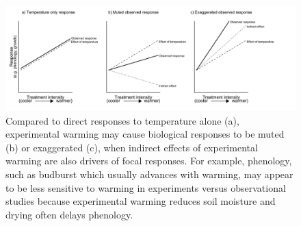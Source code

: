 \documentclass{article}
\begin{document}
 \clearpage
 \begin{figure}[h]
 \includegraphics{../Analyses/figures/DirIndWarmingEffects.pdf} 
 \caption{Compared to direct responses to temperature alone (a), experimental warming may cause biological responses to be muted (b) or exaggerated (c), when indirect effects of experimental warming are also drivers of focal responses. For example, phenology, such as budburst which usually advances with warming, may appear to be less sensitive to warming in experiments versus observational studies \citep{wolkovich2012} because experimental warming reduces soil moisture and drying often delays phenology.}
\label{fig:biolimp}
  \end{figure}
\end{document}
